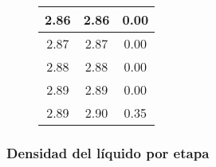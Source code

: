 \begin{figure}[H]
\begin{tabular}{|c|c|c|}
        \hline
        2.86           & 2.86            & 0.00                         \\
        \hline
        2.87           & 2.87            & 0.00                         \\
        \hline
        2.88           & 2.88            & 0.00                         \\
        \hline
        2.89           & 2.89            & 0.00                         \\
        \hline
        2.89           & 2.90            & 0.35                         \\
        \hline
    \end{tabular}
    \normalsize
\end{figure}

\newpage

\subsubsection{Densidad del líquido por etapa}

